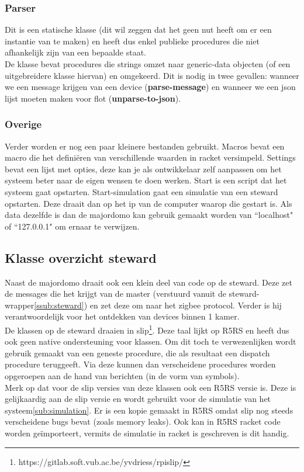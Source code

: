 \documentclass{article}
\begin{document}
\subsubsection{Parser}
\label{ssub:parser}
Dit is een statische klasse (dit wil zeggen dat het geen nut heeft om er een instantie van te maken) en heeft dus enkel publieke procedures die niet afhankelijk zijn van een bepaalde staat.\\
De klasse bevat procedures die strings omzet naar generic-data objecten (of een uitgebreidere klasse hiervan) en omgekeerd. Dit is nodig in twee gevallen: wanneer we een message krijgen van een device (\textbf{parse-message}) en wanneer we een json lijst moeten maken voor flot (\textbf{unparse-to-json}).\\

\subsubsection{Overige}
\label{ssub:rest}
Verder worden er nog een paar kleinere bestanden gebruikt. Macros bevat een macro die het defini\"eren van verschillende waarden in racket versimpeld. Settings bevat een lijst met opties, deze kan je als ontwikkelaar zelf aanpassen om het systeem beter naar de eigen wensen te doen werken. Start is een script dat het systeem gaat opstarten. Start-simulation gaat een simulatie van een steward opstarten. Deze draait dan op het ip van de computer waarop die gestart is. Als data dezelfde is dan de majordomo kan gebruik gemaakt worden van ``localhost" of ``127.0.0.1" om ernaar te verwijzen.


\subsection{Klasse overzicht steward}
\label{sub:class-steward}
Naast de majordomo draait ook een klein deel van code op de steward. Deze zet de messages die het krijgt van de master (verstuurd vanuit de steward-wrapper\ref{ssub:steward}) en zet deze om naar het zigbee protocol. Verder is hij verantwoordelijk voor het ontdekken van devices binnen 1 kamer.\\
De klassen op de steward draaien in slip\footnote{https://gitlab.soft.vub.ac.be/yvdriess/rpislip/}. Deze taal lijkt op R5RS en heeft dus ook geen native ondersteuning voor klassen. Om dit toch te verwezenlijken wordt gebruik gemaakt van een geneste procedure, die als resultaat een dispatch procedure teruggeeft. Via deze kunnen dan verscheidene procedures worden opgeroepen aan de hand van berichten (in de vorm van symbols).\\
Merk op dat voor de slip versies van deze klassen ook een R5RS versie is. Deze is gelijkaardig aan de slip versie en wordt gebruikt voor de simulatie van het systeem\ref{sub:simulation}. Er is een kopie gemaakt in R5RS omdat slip nog steeds verscheidene bugs bevat (zoals memory leaks). Ook kan in R5RS racket code worden ge\"importeert, vermits de simulatie in racket is geschreven is dit handig.
\end{document}
